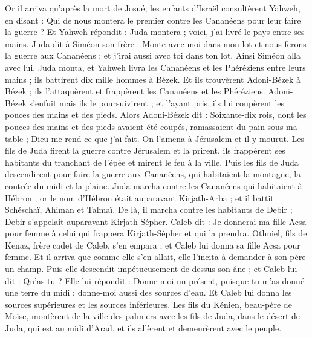 \begin{multicols}{2}
\VerseOne{}Or il arriva qu'après la mort de Josué, les enfants d'Israël consultèrent Yahweh, en disant : Qui de nous montera le premier contre les Cananéens pour leur faire la guerre ?
Et Yahweh répondit : Juda montera ; voici, j'ai livré le pays entre ses mains.
Juda dit à Siméon son frère : Monte avec moi dans mon lot et nous ferons la guerre aux Cananéens ; et j'irai aussi avec toi dans ton lot. Ainsi Siméon alla avec lui.
Juda monta, et Yahweh livra les Cananéens et les Phéréziens entre leurs mains ; ils battirent dix mille hommes à Bézek.
Et ils trouvèrent Adoni-Bézek à Bézek ; ils l'attaquèrent et frappèrent les Cananéens et les Phéréziens.
Adoni-Bézek s'enfuit mais ils le poursuivirent ; et l'ayant pris, ils lui coupèrent les pouces des mains et des pieds.
Alors Adoni-Bézek dit : Soixante-dix rois, dont les pouces des mains et des pieds avaient été coupés, ramassaient du pain sous ma table ; Dieu me rend ce que j'ai fait. On l'amena à Jérusalem et il y mourut.
Les fils de Juda firent la guerre contre Jérusalem et la prirent, ils frappèrent ses habitants du tranchant de l'épée et mirent le feu à la ville.
Puis les fils de Juda descendirent pour faire la guerre aux Cananéens, qui habitaient la montagne, la contrée du midi et la plaine.
Juda marcha contre les Cananéens qui habitaient à Hébron ; or le nom d'Hébron était auparavant Kirjath-Arba ; et il battit Schéschaï, Ahiman et Talmaï.
De là, il marcha contre les habitants de Debir ; Debir s'appelait auparavant Kirjath-Sépher.
Caleb dit : Je donnerai ma fille Acsa pour femme à celui qui frappera Kirjath-Sépher et qui la prendra.
Othniel, fils de Kenaz, frère cadet de Caleb, s'en empara ; et Caleb lui donna sa fille Acsa pour femme.
Et il arriva que comme elle s'en allait, elle l'incita à demander à son père un champ. Puis elle descendit impétueusement de dessus son âne ; et Caleb lui dit : Qu'as-tu ?
Elle lui répondit : Donne-moi un présent, puisque tu m'as donné une terre du midi ; donne-moi aussi des sources d'eau. Et Caleb lui donna les sources supérieures et les sources inférieures.
Les fils du Kénien, beau-père de Moïse, montèrent de la ville des palmiers avec les fils de Juda, dans le désert de Juda, qui est au midi d'Arad, et ils allèrent et demeurèrent avec le peuple.

\end{multicols}
